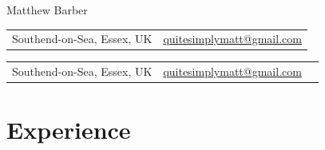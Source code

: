 \documentclass[11pt]{article}
\newcommand{\infoicon}[2][0]{
	\raisebox{#1}{\def\svgwidth{1em}}
}
\def\myphonenumber{}
\begin{document}
\thispagestyle{empty} %
\raggedright
\color{primary}

{\titlefont Matthew Barber}

\newcommand{\contactrow}{%
	\infoicon[-0.1em]{location}Southend-on-Sea, Essex, UK &
	\infoicon[-0.2em]{email}\hspace{2pt}\href{mailto:quitesimplymatt@gmail.com}{quitesimplymatt@gmail.com}%
}

\ifx\myphonenumber\empty
	\begin{tabularx}{\textwidth}{ @{} l r @{} }
		\contactrow
	\end{tabularx}
\else
	\begin{tabularx}{\textwidth}{ @{} l c r @{} }
		\contactrow &
		\infoicon[-0.1em]{mobile}\hspace{1pt}\myphonenumber
	\end{tabularx}
\fi

\section*{Experience}
\end{document}
